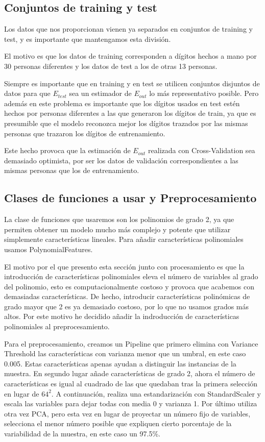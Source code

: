\documentclass[a4]{article}
\begin{document}
\subsection{Conjuntos de training y test}

Los datos que nos proporcionan vienen ya separados en conjuntos de
training y test, y es importante que mantengamos esta división.

El motivo es que los datos de training corresponden a dígitos hechos a
mano por 30 personas diferentes y los datos de test a los de otras 13
personas.

Siempre es importante que en training y en test se utilicen conjuntos
disjuntos de datos para que $E_{test}$ sea un estimador de $E_{out}$
lo más representativo posible. Pero además en este problema es
importante que los dígitos usados en test estén hechos por personas
diferentes a las que generaron los dígitos de train, ya que es
presumible que el modelo reconozca mejor los dígitos trazados por las
mismas personas que trazaron los dígitos de entrenamiento.

Este hecho provoca que la estimación de $E_{out}$ realizada con
Cross-Validation sea demasiado optimista, por ser los datos de
validación correspondientes a las mismas personas que los de
entrenamiento. \label{cv-optimistic}


\subsection{Clases de funciones a usar y Preprocesamiento}

La clase de funciones que usaremos son los polinomios de grado 2, ya
que permiten obtener un modelo mucho más complejo y potente que
utilizar simplemente características lineales. Para añadir
características polinomiales usamos PolynomialFeatures.

El motivo por el que presento esta sección junto con procesamiento es
que la introducción de características polinomiales eleva el número de
variables al grado del polinomio, esto es computacionalmente costoso y
provoca que acabemos con demasiadas características. De hecho,
introducir características polinómicas de grado mayor que 2 es ya
demasiado costoso, por lo que no usamos grados más altos. Por este
motivo he decidido añadir la indroducción de características
polinomiales al preprocesamiento.

Para el preprocesamiento, creamos un Pipeline que primero elimina con
Variance Threshold las características con varianza menor que un
umbral, en este caso 0.005. Estas características apenas ayudan a
distinguir las instancias de la muestra. En segundo lugar añade
características de grado 2, ahora el número de características es
igual al cuadrado de las que quedaban tras la primera selección en
lugar de $64^2$. A continuación, realiza una estandarización con
StandardScaler y escala las variables para dejar todas con media 0 y
varianza 1. Por último utiliza otra vez PCA, pero esta vez en lugar de
proyectar un número fijo de variables, selecciona el menor número
posible que expliquen cierto porcentaje de la variabilidad de la
muestra, en este caso un 97.5\%.
\end{document}
